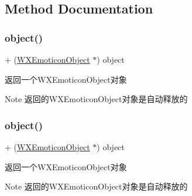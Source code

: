 \subsection{Method Documentation}
\mbox{\label{interface_w_x_emoticon_object_a6e2f8dfd9230c48f9876dbdf90e61db3}} 
\subsubsection{\texorpdfstring{object()}{object()}\hspace{0.1cm}{\footnotesize\ttfamily [1/3]}}
{\footnotesize\ttfamily + (\mbox{\hyperlink{interface_w_x_emoticon_object}{W\+X\+Emoticon\+Object}} $\ast$) object \begin{DoxyParamCaption}{ }\end{DoxyParamCaption}}



返回一个\+W\+X\+Emoticon\+Object对象 

\begin{DoxyNote}{Note}
返回的\+W\+X\+Emoticon\+Object对象是自动释放的 
\end{DoxyNote}
\mbox{\label{interface_w_x_emoticon_object_a6e2f8dfd9230c48f9876dbdf90e61db3}} 
\subsubsection{\texorpdfstring{object()}{object()}\hspace{0.1cm}{\footnotesize\ttfamily [2/3]}}
{\footnotesize\ttfamily + (\mbox{\hyperlink{interface_w_x_emoticon_object}{W\+X\+Emoticon\+Object}} $\ast$) object \begin{DoxyParamCaption}{ }\end{DoxyParamCaption}}



返回一个\+W\+X\+Emoticon\+Object对象 

\begin{DoxyNote}{Note}
返回的\+W\+X\+Emoticon\+Object对象是自动释放的 
\end{DoxyNote}
\mbox{\label{interface_w_x_emoticon_object_a6e2f8dfd9230c48f9876dbdf90e61db3}} 
